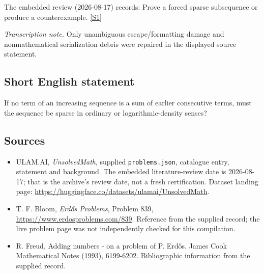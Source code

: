 \documentclass[11pt,a4paper]{article}
\newcommand{\sref}[2]{\hyperlink{source:#1:#2}{[S#2]}}
\begin{document}
The embedded review (2026-08-17) records: Prove a forced sparse subsequence or produce a counterexample. \sref{statement}{1}

{\small\emph{Transcription note.} Only unambiguous escape/formatting damage and nonmathematical serialization debris were repaired in the displayed source statement.}

\subsection{Short English statement}

If no term of an increasing sequence is a sum of earlier consecutive terms, must the sequence be sparse in ordinary or logarithmic-density senses?

\subsection{Sources}

{\small

\begin{itemize}

\item[\hypertarget{source:statement:1}{S1}] ULAM.AI, \emph{UnsolvedMath}, supplied \texttt{problems.json}, catalogue entry, statement and background. The embedded literature-review date is 2026-08-17; that is the archive’s review date, not a fresh certification. Dataset landing page: \url{https://huggingface.co/datasets/ulamai/UnsolvedMath}.

\item[\hypertarget{source:statement:2}{S2}] T. F. Bloom, \emph{Erdős Problems}, Problem 839, \url{https://www.erdosproblems.com/839}. Reference from the supplied record; the live problem page was not independently checked for this compilation.

\item[\hypertarget{source:statement:3}{S3}] R. Freud, Adding numbers - on a problem of P. Erd\H{o}s. James Cook Mathematical Notes (1993), 6199-6202. Bibliographic information from the supplied record.

\end{itemize}

}

\label{end:statement}
\end{document}
